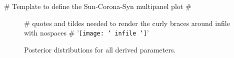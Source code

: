 {# Template to define the Sun-Corona-Syn multipanel plot #} 
\begin{figure*}[!h]
\centering
{# quotes and tildes needed to render the curly braces around infile with nospaces #}
{{'\texttt{[image: '~infile~']}'}}
\caption{Posterior distributions for all derived parameters.}
\end{figure*}
